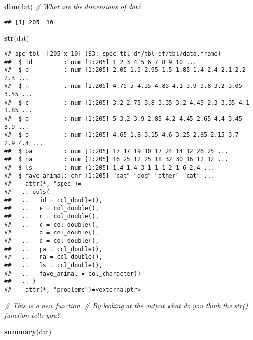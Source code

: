\documentclass[
]{article}
\newenvironment{Shaded}{\begin{snugshade}}{\end{snugshade}}
\newcommand{\CommentTok}[1]{\textcolor[rgb]{0.56,0.35,0.01}{\textit{#1}}}
\newcommand{\FunctionTok}[1]{\textcolor[rgb]{0.13,0.29,0.53}{\textbf{#1}}}
\newcommand{\NormalTok}[1]{#1}
\begin{document}
\begin{Shaded}
\begin{Highlighting}[]
\FunctionTok{dim}\NormalTok{(dat) }\CommentTok{\# What are the dimensions of dat? }
\end{Highlighting}
\end{Shaded}

\begin{verbatim}
## [1] 205  10
\end{verbatim}

\begin{Shaded}
\begin{Highlighting}[]
\FunctionTok{str}\NormalTok{(dat) }
\end{Highlighting}
\end{Shaded}

\begin{verbatim}
## spc_tbl_ [205 x 10] (S3: spec_tbl_df/tbl_df/tbl/data.frame)
##  $ id         : num [1:205] 1 2 3 4 5 6 7 8 9 10 ...
##  $ e          : num [1:205] 2.05 1.3 2.95 1.5 1.85 1.4 2.4 2.1 2.2 2.3 ...
##  $ n          : num [1:205] 4.75 5 4.35 4.85 4.1 3.9 3.8 3.2 3.05 3.55 ...
##  $ c          : num [1:205] 3.2 2.75 3.8 3.35 3.2 4.45 2.3 3.35 4.1 1.85 ...
##  $ a          : num [1:205] 5 3.2 3.9 2.85 4.2 4.45 2.65 4.4 3.45 3.9 ...
##  $ o          : num [1:205] 4.65 1.8 3.15 4.6 3.25 2.85 2.15 3.7 2.9 4.4 ...
##  $ pa         : num [1:205] 17 17 19 10 17 24 14 12 26 25 ...
##  $ na         : num [1:205] 16 25 12 25 18 32 30 16 12 12 ...
##  $ ls         : num [1:205] 1.4 1.4 3 1 1 1 2 1 6 2.4 ...
##  $ fave_animal: chr [1:205] "cat" "dog" "other" "cat" ...
##  - attr(*, "spec")=
##   .. cols(
##   ..   id = col_double(),
##   ..   e = col_double(),
##   ..   n = col_double(),
##   ..   c = col_double(),
##   ..   a = col_double(),
##   ..   o = col_double(),
##   ..   pa = col_double(),
##   ..   na = col_double(),
##   ..   ls = col_double(),
##   ..   fave_animal = col_character()
##   .. )
##  - attr(*, "problems")=<externalptr>
\end{verbatim}

\begin{Shaded}
\begin{Highlighting}[]
\CommentTok{\# This is a new function.}
\CommentTok{\# By looking at the output what do you think the str() function tells you? }
\end{Highlighting}
\end{Shaded}

\begin{Shaded}
\begin{Highlighting}[]
\FunctionTok{summary}\NormalTok{(dat)}
\end{Highlighting}
\end{Shaded}
\end{document}

